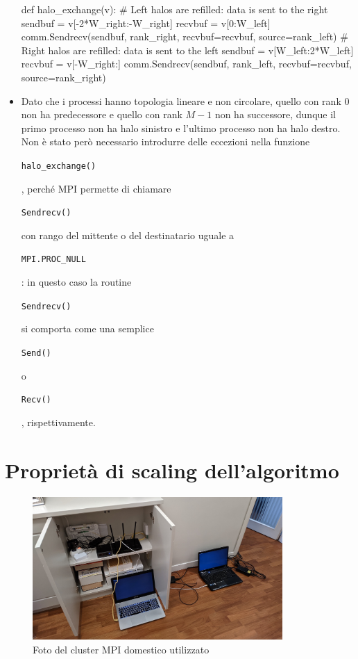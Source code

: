 \documentclass[a4paper,11pt]{article}
\newcommand{\code}[1]{\begin{small}\texttt{#1}\end{small}}
\begin{document}
\begin{itemize}
\begin{python}
def halo_exchange(v):
	# Left halos are refilled: data is sent to the right
	sendbuf = v[-2*W_right:-W_right]
	recvbuf = v[0:W_left]
	comm.Sendrecv(sendbuf, rank_right, recvbuf=recvbuf, source=rank_left)
	# Right halos are refilled: data is sent to the left
	sendbuf = v[W_left:2*W_left]
	recvbuf = v[-W_right:]
	comm.Sendrecv(sendbuf, rank_left, recvbuf=recvbuf, source=rank_right)
\end{python}
\item Dato che i processi hanno topologia lineare e non circolare,
quello con rank 0 non ha predecessore e quello con
rank $M-1$ non ha successore, dunque il primo
processo non ha halo sinistro e l'ultimo processo non
ha halo destro. Non è stato però necessario introdurre
delle eccezioni nella funzione \code{halo\_exchange()},
perché MPI permette di chiamare \code{Sendrecv()} con rango
del mittente o del destinatario uguale a \code{MPI.PROC\_NULL}:
in questo caso la routine \code{Sendrecv()} si comporta come
una semplice \code{Send()} o \code{Recv()}, rispettivamente.
\end{itemize}

\section{Proprietà di scaling dell'algoritmo}

\begin{figure}[p]
\centering
\includegraphics[width=0.85\textwidth]{figures/MPI-cluster.jpg}
\caption{Foto del cluster MPI domestico utilizzato}
\label{fig:MPI-cluster}
\end{figure}
\end{document}
